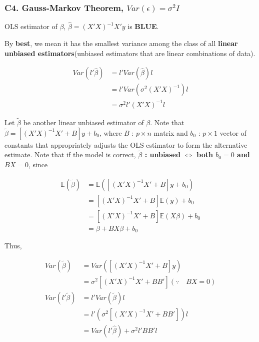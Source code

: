 \documentclass[12pt]{article}
\begin{document}

\subsubsection*{C4. Gauss-Markov Theorem, $Var(\epsilon) = \sigma^2 I $}

OLS estimator of $\beta$, $\hat{\beta} = (X' X)^{-1} X' y$ is \textbf{BLUE}.

By \textbf{best}, we mean it has the smallest variance among the class of all \textbf{linear unbiased estimators}(unbiased estimators that are linear combinations of data).

$$
\begin{aligned}
Var(l' \hat{\beta}) &= l' Var(\hat{\beta}) l \\[8pt]
&= l' Var(\sigma^2 (X' X)^{-1}) l  \\[8pt]
&= \sigma^2 l' (X' X)^{-1} l
\end{aligned}
$$

Let $\tilde{\beta}$ be another linear unbiased estimator of $\beta$. Note that $\tilde{\beta} = \left[ (X'X)^{-1} X' + B\right] y + b_0$, where $B$ : $p \times n$ matrix and $b_0$ : $p \times 1$ vector of constants that appropriately adjusts the OLS estimator to form the alternative estimate. Note that if the model is correct, \textbf{$\tilde{\beta}$ : unbiased $\Leftrightarrow$ both $b_0 = 0$ and $BX = 0$}, since 

$$
\begin{aligned}
\mathbb{E} (\tilde{\beta}) &= \mathbb{E} \left( \left[ (X'X)^{-1} X' + B\right] y + b_0 \right) \\[8pt]
&= \left[ (X'X)^{-1} X' + B\right] \mathbb{E} (y) + b_0 \\[8pt]
&= \left[ (X'X)^{-1} X' + B\right] \mathbb{E} (X \beta) + b_0 \\[8pt]
&= \beta + BX\beta + b_0
\end{aligned}
$$

Thus,

$$
\begin{aligned}
Var (\tilde{\beta}) &= Var \left(  \left[ (X'X)^{-1} X' + B \right] y \right) \\[8pt]
&= \sigma^2 \left[ (X' X)^{-1} X' + B B' \right] (\because \quad BX=0) \\[10pt]
Var (l' \tilde{\beta}) &= l' Var (\tilde{\beta}) l \\[8pt]
&= l' \left( \sigma^2 \left[ (X' X)^{-1} X' + B B' \right] \right) l \\[8pt]
&= Var(l' \hat{\beta}) + \sigma^2 l' B B' l
\end{aligned}
$$
\end{document}
